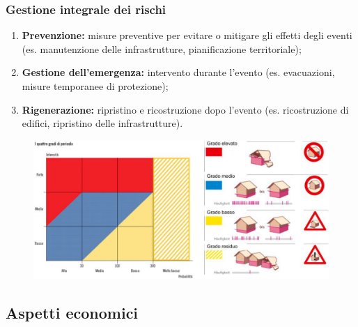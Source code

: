 \documentclass{article}
\begin{document}
\subsubsection{Gestione integrale dei rischi}
\begin{enumerate}
    \item \textbf{Prevenzione:} misure preventive per evitare o mitigare gli effetti degli
        eventi (es. manutenzione delle infrastrutture, pianificazione territoriale);
    \item \textbf{Gestione dell'emergenza:} intervento durante l'evento (es. evacuazioni, misure
        temporanee di protezione);
    \item \textbf{Rigenerazione:} ripristino e ricostruzione dopo l'evento (es. ricostruzione di
        edifici, ripristino delle infrastrutture).
\end{enumerate}
\phantom{}

\begin{figure}[ht!]
    \begin{center}
        \includegraphics[width=.9\textwidth]{media/geo_civica/gradi_di_pericolo.png}
    \end{center}
\end{figure}

\newpage
\subsection{Aspetti economici}
\end{document}
